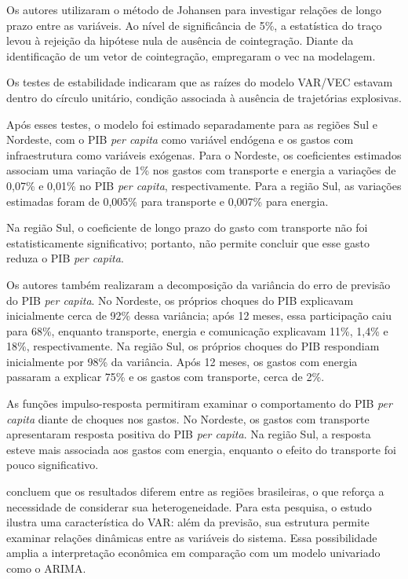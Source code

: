 Os autores utilizaram o método de Johansen para investigar relações de longo prazo entre as variáveis. Ao nível de significância de 5\%, a estatística do traço levou à rejeição da hipótese nula de ausência de cointegração. Diante da identificação de um vetor de cointegração, empregaram o \ac{vec} na modelagem.

Os testes de estabilidade indicaram que as raízes do modelo VAR/VEC estavam dentro do círculo unitário, condição associada à ausência de trajetórias explosivas.

Após esses testes, o modelo foi estimado separadamente para as regiões Sul e Nordeste, com o PIB \textit{per capita} como variável endógena e os gastos com infraestrutura como variáveis exógenas. Para o Nordeste, os coeficientes estimados associam uma variação de 1\% nos gastos com transporte e energia a variações de 0,07\% e 0,01\% no PIB \textit{per capita}, respectivamente. Para a região Sul, as variações estimadas foram de 0,005\% para transporte e 0,007\% para energia.

Na região Sul, o coeficiente de longo prazo do gasto com transporte não foi estatisticamente significativo; portanto, não permite concluir que esse gasto reduza o PIB \textit{per capita}.

Os autores também realizaram a decomposição da variância do erro de previsão do PIB \textit{per capita}. No Nordeste, os próprios choques do PIB explicavam inicialmente cerca de 92\% dessa variância; após 12 meses, essa participação caiu para 68\%, enquanto transporte, energia e comunicação explicavam 11\%, 1,4\% e 18\%, respectivamente. Na região Sul, os próprios choques do PIB respondiam inicialmente por 98\% da variância. Após 12 meses, os gastos com energia passaram a explicar 75\% e os gastos com transporte, cerca de 2\%.

As funções impulso-resposta permitiram examinar o comportamento do PIB \textit{per capita} diante de choques nos gastos. No Nordeste, os gastos com transporte apresentaram resposta positiva do PIB \textit{per capita}. Na região Sul, a resposta esteve mais associada aos gastos com energia, enquanto o efeito do transporte foi pouco significativo.

 concluem que os resultados diferem entre as regiões brasileiras, o que reforça a necessidade de considerar sua heterogeneidade. Para esta pesquisa, o estudo ilustra uma característica do VAR: além da previsão, sua estrutura permite examinar relações dinâmicas entre as variáveis do sistema. Essa possibilidade amplia a interpretação econômica em comparação com um modelo univariado como o ARIMA.

